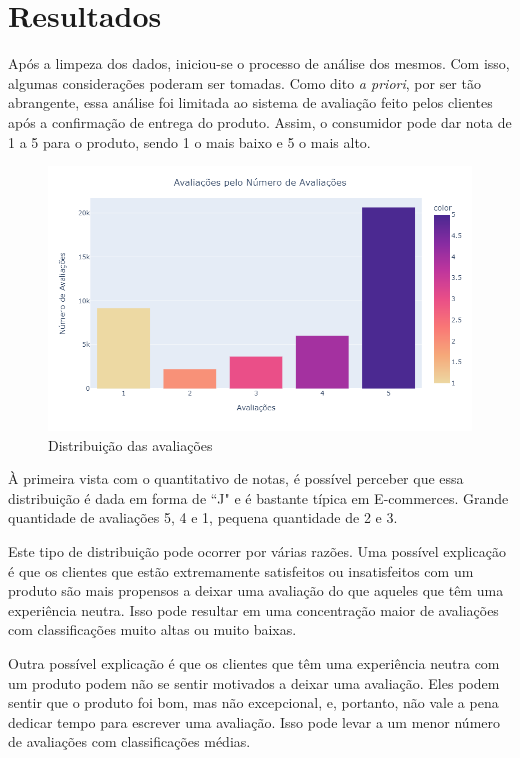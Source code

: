 \section{Resultados}
\label{sec:results}

Após a limpeza dos dados, iniciou-se o processo de análise dos mesmos. Com isso, algumas considerações poderam ser tomadas. Como dito \textit{a priori}, por ser tão abrangente, essa análise foi limitada ao sistema de avaliação feito pelos clientes após a confirmação de entrega do produto. Assim, o consumidor pode dar nota de 1 a 5 para o produto, sendo 1 o mais baixo e 5 o mais alto.


\begin{figure}[H]
    \centering
    \includegraphics[trim={0cm 2cm 3cm 2cm},clip,scale=0.65]{./figs/eval.png}
    \caption{Distribuição das avaliações}
    \label{fig:evalDistribution}
\end{figure}

À primeira vista com o quantitativo de notas, é possível perceber que essa  distribuição é dada em forma de ``J" e é bastante típica em E-commerces. Grande  quantidade de avaliações 5, 4 e 1, pequena quantidade de 2 e 3.

Este tipo de distribuição pode ocorrer por várias razões. Uma possível explicação é que os clientes que estão extremamente satisfeitos ou insatisfeitos com um produto são mais propensos a deixar uma avaliação do que aqueles que têm uma experiência neutra. Isso pode resultar em uma concentração maior de avaliações com classificações muito altas ou muito baixas.

Outra possível explicação é que os clientes que têm uma experiência neutra com um produto podem não se sentir motivados a deixar uma avaliação. Eles podem sentir que o produto foi bom, mas não excepcional, e, portanto, não vale a pena dedicar tempo para escrever uma avaliação. Isso pode levar a um menor número de avaliações com classificações médias.

